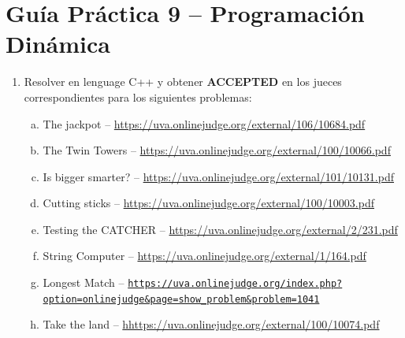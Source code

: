 




\section*{Gu\'ia Pr\'actica 9 -- Programación Dinámica}

\begin{enumerate}[1 -]
	
	\item Resolver en lenguage C++ y obtener \textbf{ACCEPTED} en los jueces correspondientes para los siguientes problemas:
	
	\begin{enumerate}[a)]
		\item The jackpot -- \href{https://uva.onlinejudge.org/external/106/10684.pdf}{https://uva.onlinejudge.org/external/106/10684.pdf}		
				
		
		\item The Twin Towers -- \href{https://uva.onlinejudge.org/external/100/10066.pdf}{https://uva.onlinejudge.org/external/100/10066.pdf}		

		
		\item Is bigger smarter? -- \href{https://uva.onlinejudge.org/external/101/10131.pdf}{https://uva.onlinejudge.org/external/101/10131.pdf}
		
				
		\item Cutting sticks -- \href{https://uva.onlinejudge.org/external/100/10003.pdf}{https://uva.onlinejudge.org/external/100/10003.pdf}
		
		\item Testing the CATCHER -- \href{https://uva.onlinejudge.org/external/2/231.pdf}{https://uva.onlinejudge.org/external/2/231.pdf}		
		
		\item String Computer -- \href{https://uva.onlinejudge.org/external/1/164.pdf}{https://uva.onlinejudge.org/external/1/164.pdf}		
		
		\item Longest Match -- 
		\href{https://uva.onlinejudge.org/index.php?option=onlinejudge\&page=show_problem\&problem=1041}{\nolinkurl{https://uva.onlinejudge.org/index.php?option=onlinejudge\&page=show\_problem\&problem=1041}}

		\item Take the land -- \href{https://uva.onlinejudge.org/external/100/10074.pdf}{hhttps://uva.onlinejudge.org/external/100/10074.pdf}

	\end{enumerate}
\end{enumerate}

